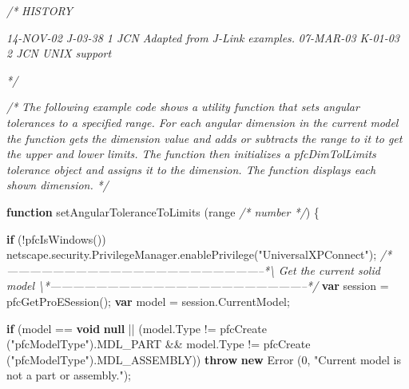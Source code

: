 \documentclass[]{article}
\newenvironment{Shaded}{}{}
\newcommand{\KeywordTok}[1]{\textcolor[rgb]{0.00,0.44,0.13}{\textbf{{#1}}}}
\newcommand{\DecValTok}[1]{\textcolor[rgb]{0.25,0.63,0.44}{{#1}}}
\newcommand{\StringTok}[1]{\textcolor[rgb]{0.25,0.44,0.63}{{#1}}}
\newcommand{\CommentTok}[1]{\textcolor[rgb]{0.38,0.63,0.69}{\textit{{#1}}}}
\newcommand{\OtherTok}[1]{\textcolor[rgb]{0.00,0.44,0.13}{{#1}}}
\newcommand{\FunctionTok}[1]{\textcolor[rgb]{0.02,0.16,0.49}{{#1}}}
\newcommand{\NormalTok}[1]{{#1}}
\begin{document}
\begin{Shaded}
\begin{Highlighting}[]
\CommentTok{/*}
\CommentTok{   HISTORY}

\CommentTok{14-NOV-02   J-03-38   $$1   JCN      Adapted from J-Link examples.}
\CommentTok{07-MAR-03   K-01-03   $$2   JCN      UNIX support}

\CommentTok{*/}

\CommentTok{/*}
\CommentTok{  The following example code shows a utility function that sets angular }
\CommentTok{  tolerances to a specified range.   For each angular dimension in the current }
\CommentTok{  model the function gets the dimension value and adds or subtracts the range }
\CommentTok{  to it to get the upper and lower limits.  The function then initializes a }
\CommentTok{  pfcDimTolLimits tolerance object and assigns it to the dimension.   The }
\CommentTok{  function displays each shown dimension.}
\CommentTok{*/}

\KeywordTok{function} \FunctionTok{setAngularToleranceToLimits} \NormalTok{(range }\CommentTok{/* number */}\NormalTok{)}
\NormalTok{\{}
  
  \KeywordTok{if} \NormalTok{(!}\FunctionTok{pfcIsWindows}\NormalTok{())}
    \OtherTok{netscape}\NormalTok{.}\OtherTok{security}\NormalTok{.}\OtherTok{PrivilegeManager}\NormalTok{.}\FunctionTok{enablePrivilege}\NormalTok{(}\StringTok{"UniversalXPConnect"}\NormalTok{);}
 \CommentTok{/*--------------------------------------------------------------------*\textbackslash{} }
\CommentTok{   Get the current solid model }
\CommentTok{ \textbackslash{}*--------------------------------------------------------------------*/}  
  \KeywordTok{var} \NormalTok{session = }\FunctionTok{pfcGetProESession}\NormalTok{();}
  \KeywordTok{var} \NormalTok{model = }\OtherTok{session}\NormalTok{.}\FunctionTok{CurrentModel}\NormalTok{;}
  
  \KeywordTok{if} \NormalTok{(model == }\KeywordTok{void} \KeywordTok{null} \NormalTok{|| (}\OtherTok{model}\NormalTok{.}\FunctionTok{Type} \NormalTok{!= }\FunctionTok{pfcCreate} \NormalTok{(}\StringTok{"pfcModelType"}\NormalTok{).}\FunctionTok{MDL_PART} \NormalTok{&& }
                 \OtherTok{model}\NormalTok{.}\FunctionTok{Type} \NormalTok{!= }\FunctionTok{pfcCreate} \NormalTok{(}\StringTok{"pfcModelType"}\NormalTok{).}\FunctionTok{MDL_ASSEMBLY}\NormalTok{))}
    \KeywordTok{throw} \KeywordTok{new} \FunctionTok{Error} \NormalTok{(}\DecValTok{0}\NormalTok{, }\StringTok{"Current model is not a part or assembly."}\NormalTok{);}
  

\end{Highlighting}
\end{Shaded}
\end{document}
